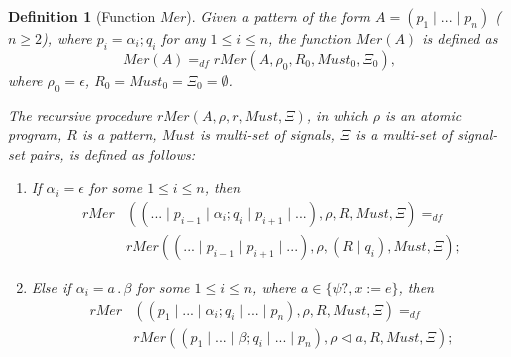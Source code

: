 \documentclass{fcs}
\newtheorem{mydef}{Definition}[section]
\DeclareMathOperator{\seq}{;}
\newcommand{\Must}[0]{\mathit{Must}}
\DeclareMathOperator{\sep}{|}
\DeclareMathOperator{\nex}{.}
\newcommand{\Merge}[0]{\mathit{Mer}}
\newcommand{\rMerge}[0]{\mathit{rMer}}
\newcommand{\append}[0]{\triangleleft}
\newcommand{\Sigs}[0]{\mathit{Sig}}
\newcommand{\SV}[0]{\Xi}
\newcommand{\Can}[0]{\mathit{Can}}
\newcommand{\dddef}[0]{=_{df}}
\begin{document}
\begin{mydef}[Function $\Merge$]
    \label{def:Function Merge}
            Given a pattern of the form $A = (p_1\sep...\sep p_n)$ ($n\ge 2$), where $p_i = \alpha_i\seq q_i$ for any $1\le i\le n$, the function $\Merge(A)$ is defined as
    $$\Merge(A)\dddef \rMerge(A, \rho_0, R_0, \Must_0, \SV_0), $$
    where $\rho_0 = \epsilon$, %
    $R_0 = \Must_0 = \SV_0 = \emptyset$.


    The recursive procedure $\rMerge(A, \rho, r, \Must, \SV)$, in which
    $\rho$ is an atomic program, $R$ is a pattern,
    $\Must$ is multi-set of signals, $\SV$ is a multi-set of signal-set pairs, is defined as follows:
    \begin{enumerate}
        \item If $\alpha_i = \epsilon$ for some $1\le i\le n$, then
        $$\begin{aligned}
        \rMerge&((...\sep p_{i-1}\sep \alpha_i\seq q_{i}\sep p_{i+1}\sep...),
        \rho, R, \Must, \SV)
        \dddef\\
        &\rMerge((...\sep p_{i-1}\sep p_{i+1}\sep...),
        \rho, (R\sep q_i), \Must, \SV);
        \end{aligned}
        $$

        \item Else if $\alpha_i = a\nex \beta$ for some $1\le i\le n$, where $a\in \{\psi?, x:=e\}$, then
        $$\begin{aligned}
        \rMerge&((p_1\sep ...\sep \alpha_i\seq q_{i}\sep...\sep p_n),
        \rho, R,  \Must, \SV)
        \dddef\\
        &\rMerge((p_1\sep ...\sep \beta\seq q_{i}\sep...\sep p_n),
        \rho\append a, R, \Must, \SV)
        ;
        \end{aligned}
        $$


\end{enumerate}
\end{mydef}
\end{document}
